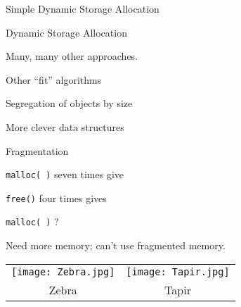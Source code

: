 \documentclass{plt}
\begin{document}
\begin{frame}[fragile]{Simple Dynamic Storage Allocation}

\end{frame}

\begin{frame}{Dynamic Storage Allocation}

Many, many other approaches.

Other ``fit'' algorithms

Segregation of objects by size

More clever data structures

\end{frame}
%
%
%
%
%
%
%
%

\begin{frame}{Fragmentation}

\texttt{malloc(  )} seven times give


\medskip

\texttt{free()} four times gives


\medskip

\texttt{malloc(  )} ?

Need more memory; can't use fragmented memory.


\begin{tabular}{cc}
  \texttt{[image: Zebra.jpg]}
  &
  \texttt{[image: Tapir.jpg]}
  \\
  Zebra
  &
  Tapir
  \\
\end{tabular}

\end{frame}
\end{document}

